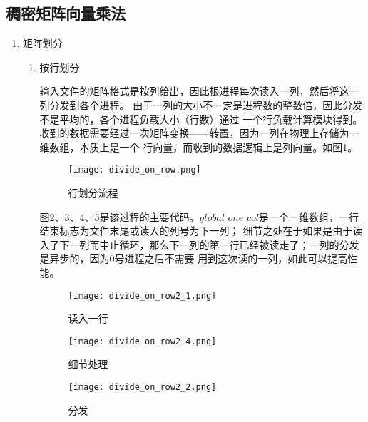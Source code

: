 \documentclass[UTF8,a4paper,12pt]{article}
\begin{document}
\subsection{稠密矩阵向量乘法}
\begin{enumerate}[itemindent=0.5em,label=\arabic*、]
  \item 矩阵划分
  \begin{enumerate}
    \item 按行划分
    \par 输入文件的矩阵格式是按列给出，因此根进程每次读入一列，然后将这一列分发到各个进程。
    由于一列的大小不一定是进程数的整数倍，因此分发不是平均的，各个进程负载大小（行数）通过
    一个行负载计算模块得到。收到的数据需要经过一次矩阵变换——转置，因为一列在物理上存储为一维数组，本质上是一个
    行向量，而收到的数据逻辑上是列向量。如图1。
    \begin{figure}[h]
    \begin{center}
    \texttt{[image: divide\_on\_row.png]} %
    \caption{行划分流程}
    \end{center}
    \end{figure}
    \newpage
    \par 图2、3、4、5是该过程的主要代码。$global\_one\_col$是一个一维数组，一行结束标志为文件末尾或读入的列号为下一列；
    细节之处在于如果是由于读入了下一列而中止循环，那么下一列的第一行已经被读走了；一列的分发是异步的，因为0号进程之后不需要
    用到这次读的一列，如此可以提高性能。
    \begin{figure}[h]
    \begin{center}
    \texttt{[image: divide\_on\_row2\_1.png]} %
    \caption{读入一行}
    \end{center}
    \end{figure}

    \begin{figure}[h]
    \begin{center}
    \texttt{[image: divide\_on\_row2\_4.png]} %
    \caption{细节处理}
    \end{center}
    \end{figure}

    \begin{figure}[h]
    \begin{center}
    \texttt{[image: divide\_on\_row2\_2.png]} %
    \caption{分发}
    \end{center}
    \end{figure}


\end{enumerate}
\end{enumerate}
\end{document}

